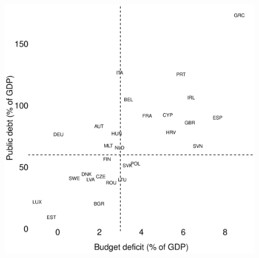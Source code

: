 \documentclass{beamer}
\begin{document}
\begin{frame}
  \begin{figure}
    \includegraphics[scale=.3]{fiscal_compliance}
  \end{figure}
\end{frame}

\end{document}
